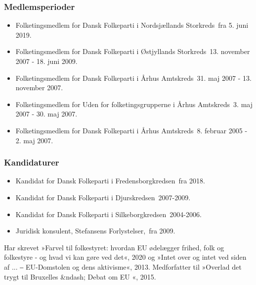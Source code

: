 \documentclass[11pt, a4paper]{awesome-cv}
\begin{document}
\begin{cvletter}
\subsubsection*{Medlemsperioder}
\begin{itemize}
\item Folketingsmedlem for Dansk Folkeparti i Nordsjællands Storkreds fra 5. juni 2019.
\item Folketingsmedlem for Dansk Folkeparti i Østjyllands Storkreds 13. november 2007 - 18. juni 2009.
\item Folketingsmedlem for Dansk Folkeparti i Århus Amtskreds 31. maj 2007 - 13. november 2007.
\item Folketingsmedlem for Uden for folketingsgrupperne i Århus Amtskreds 3. maj 2007 - 30. maj 2007.
\item Folketingsmedlem for Dansk Folkeparti i Århus Amtskreds 8. februar 2005 - 2. maj 2007.
\end{itemize}
\subsubsection*{Kandidaturer}
\begin{itemize}
\item Kandidat for Dansk Folkeparti i Fredensborgkredsen fra 2018.
\item Kandidat for Dansk Folkeparti i Djurskredsen 2007-2009.
\item Kandidat for Dansk Folkeparti i Silkeborgkredsen 2004-2006.
\end{itemize}
\begin{itemize}
\item Juridisk konsulent, Stefansens Forlystelser, fra 2009.
\end{itemize}
Har skrevet »Farvel til folkestyret: hvordan EU ødelægger frihed, folk og folkestyre - og hvad vi kan gøre ved det«, 2020 og »Intet over og intet ved siden af ... ‒ EU-Domstolen og dens aktivisme«, 2013. Medforfatter til »Overlad det trygt til Bruxelles &ndash; Debat om EU «, 2015.

\end{cvletter}
\end{document}
